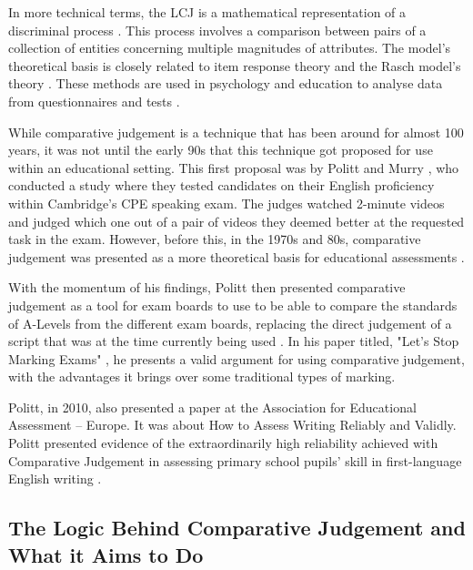 		In more technical terms, the LCJ is a mathematical representation of a discriminal process \cite{thurstone1927psychophysical}. This process involves a comparison between pairs of a collection of entities concerning multiple magnitudes of attributes. The model's theoretical basis is closely related to item response theory \cite{embretson2013item} and the Rasch model's theory \cite{wright2000understanding}. These methods are used in psychology and education to analyse data from questionnaires and tests \cite{research_ed, furr2021psychometrics}.
		
		While comparative judgement is a technique that has been around for almost 100 years, it was not until the early 90s that this technique got proposed for use within an educational setting. This first proposal was by Politt and Murry \cite{pollitt1996raters}, who conducted a study where they tested candidates on their English proficiency within Cambridge's CPE speaking exam. The judges watched 2-minute videos and judged which one out of a pair of videos they deemed better at the requested task in the exam. However, before this, in the 1970s and 80s, comparative judgement was presented as a more theoretical basis for educational assessments \cite{andrich1978rating}.  
		
		With the momentum of his findings, Politt then presented comparative judgement as a tool for exam boards to use to be able to compare the standards of A-Levels from the different exam boards, replacing the direct judgement of a script that was at the time currently being used \cite{newton2007paired}. In his paper titled, "Let's Stop Marking Exams" \cite{stop_marking_pollitt}, he presents a valid argument for using comparative judgement, with the advantages it brings over some traditional types of marking.
		
		Politt, in 2010, also presented a paper at the Association for Educational Assessment – Europe. It was about How to Assess Writing Reliably and Validly. Politt presented evidence of the extraordinarily high reliability achieved with Comparative Judgement in assessing primary school pupils' skill in first-language English writing \cite{pollitt2009abolishing}.
		
	\subsection{The Logic Behind Comparative Judgement and What it Aims to Do} %
		
